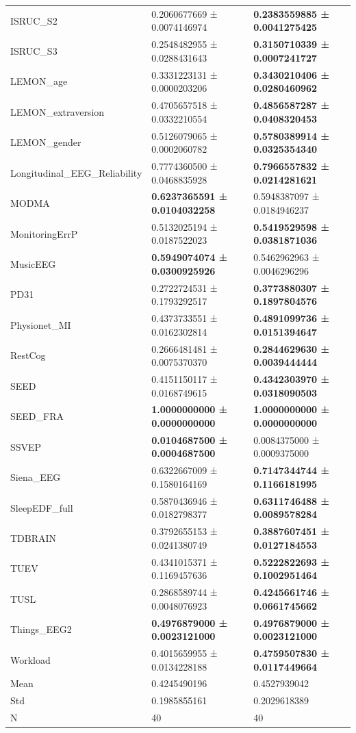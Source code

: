 \begin{table}[htbp]
\begin{tabular}{lll}
ISRUC_S2 & 0.2060677669 ± 0.0074146974 & \bfseries 0.2383559885 ± 0.0041275425 \\
ISRUC_S3 & 0.2548482955 ± 0.0288431643 & \bfseries 0.3150710339 ± 0.0007241727 \\
LEMON_age & 0.3331223131 ± 0.0000203206 & \bfseries 0.3430210406 ± 0.0280460962 \\
LEMON_extraversion & 0.4705657518 ± 0.0332210554 & \bfseries 0.4856587287 ± 0.0408320453 \\
LEMON_gender & 0.5126079065 ± 0.0002060782 & \bfseries 0.5780389914 ± 0.0325354340 \\
Longitudinal_EEG_Reliability & 0.7774360500 ± 0.0468835928 & \bfseries 0.7966557832 ± 0.0214281621 \\
MODMA & \bfseries 0.6237365591 ± 0.0104032258 & 0.5948387097 ± 0.0184946237 \\
MonitoringErrP & 0.5132025194 ± 0.0187522023 & \bfseries 0.5419529598 ± 0.0381871036 \\
MusicEEG & \bfseries 0.5949074074 ± 0.0300925926 & 0.5462962963 ± 0.0046296296 \\
PD31 & 0.2722724531 ± 0.1793292517 & \bfseries 0.3773880307 ± 0.1897804576 \\
Physionet_MI & 0.4373733551 ± 0.0162302814 & \bfseries 0.4891099736 ± 0.0151394647 \\
RestCog & 0.2666481481 ± 0.0075370370 & \bfseries 0.2844629630 ± 0.0039444444 \\
SEED & 0.4151150117 ± 0.0168749615 & \bfseries 0.4342303970 ± 0.0318090503 \\
SEED_FRA & \bfseries 1.0000000000 ± 0.0000000000 & \bfseries 1.0000000000 ± 0.0000000000 \\
SSVEP & \bfseries 0.0104687500 ± 0.0004687500 & 0.0084375000 ± 0.0009375000 \\
Siena_EEG & 0.6322667009 ± 0.1580164169 & \bfseries 0.7147344744 ± 0.1166181995 \\
SleepEDF_full & 0.5870436946 ± 0.0182798377 & \bfseries 0.6311746488 ± 0.0089578284 \\
TDBRAIN & 0.3792655153 ± 0.0241380749 & \bfseries 0.3887607451 ± 0.0127184553 \\
TUEV & 0.4341015371 ± 0.1169457636 & \bfseries 0.5222822693 ± 0.1002951464 \\
TUSL & 0.2868589744 ± 0.0048076923 & \bfseries 0.4245661746 ± 0.0661745662 \\
Things_EEG2 & \bfseries 0.4976879000 ± 0.0023121000 & \bfseries 0.4976879000 ± 0.0023121000 \\
Workload & 0.4015659955 ± 0.0134228188 & \bfseries 0.4759507830 ± 0.0117449664 \\
Mean & 0.4245490196 & 0.4527939042 \\
Std & 0.1985855161 & 0.2029618389 \\
N & 40 & 40 \\
\bottomrule
\end{tabular}
\end{table}
